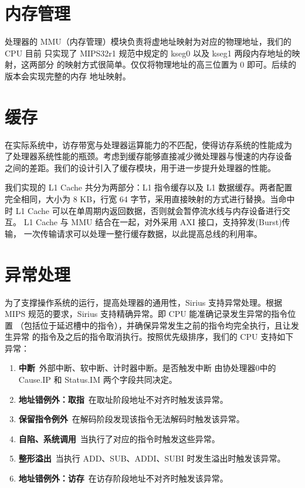 \documentclass[blue,normal,cn]{elegantbook}
\begin{document}
\section{内存管理}

处理器的 MMU（内存管理）模块负责将虚地址映射为对应的物理地址，我们的 CPU 目前
只实现了 MIPS32r1 规范中规定的 kseg0 以及 kseg1 两段内存地址的映射，这两部分
的映射方式很简单。仅仅将物理地址的高三位置为 0 即可。后续的版本会实现完整的内存
地址映射。

\section{缓存}

在实际系统中，访存带宽与处理器运算能力的不匹配，使得访存系统的性能成为
了处理器系统性能的瓶颈。考虑到缓存能够直接减少微处理器与慢速的内存设备
之间的差距。我们的设计引入了缓存模块，用于进一步提升处理器的性能。

我们实现的 L1 Cache 共分为两部分：L1 指令缓存以及 L1 数据缓存。两者配置
完全相同，大小为 8 KB，行宽 64 字节，采用直接映射的方式进行替换。当命中时
L1 Cache 可以在单周期内返回数据，否则就会暂停流水线与内存设备进行交互。
L1 Cache 与 MMU 结合在一起，对外采用 AXI 接口，支持猝发(Burst)传输，
一次传输请求可以处理一整行缓存数据，以此提高总线的利用率。

\section{异常处理}

为了支撑操作系统的运行，提高处理器的通用性，Sirius 支持异常处理。根据 MIPS 
规范的要求，Sirius 支持精确异常。即 CPU 能准确记录发生异常的指令位置
（包括位于延迟槽中的指令），并确保异常发生之前的指令均完全执行，且让发生异常
的指令及之后的指令取消执行。按照优先级排序，我们的 CPU 支持如下异常：

\begin{enumerate}
    \item \textbf{中断}\ 外部中断、软中断、计时器中断。是否触发中断
    由协处理器0中的 Cause.IP 和 Status.IM 两个字段共同决定。
    \item \textbf{地址错例外：取指}\ 在取址阶段地址不对齐时触发该异常。
    \item \textbf{保留指令例外}\ 在解码阶段发现该指令无法解码时触发该异常。
    \item \textbf{自陷、系统调用}\ 当执行了对应的指令时触发这些异常。
    \item \textbf{整形溢出}\ 当执行 ADD、SUB、ADDI、SUBI 时发生溢出时触发该异常。
    \item \textbf{地址错例外：访存}\ 在访存阶段地址不对齐时触发该异常。
\end{enumerate}
\end{document}
